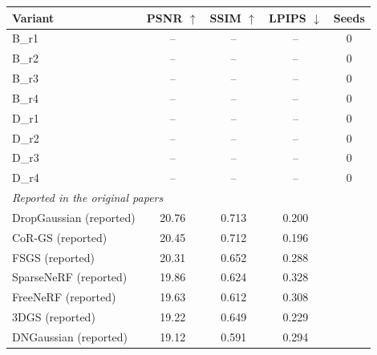 \begin{tabular}{lcccc}
\toprule
Variant & PSNR $\uparrow$ & SSIM $\uparrow$ & LPIPS $\downarrow$ & Seeds \\
\midrule
B_r1 & – & – & – & 0 \\
B_r2 & – & – & – & 0 \\
B_r3 & – & – & – & 0 \\
B_r4 & – & – & – & 0 \\
D_r1 & – & – & – & 0 \\
D_r2 & – & – & – & 0 \\
D_r3 & – & – & – & 0 \\
D_r4 & – & – & – & 0 \\
\midrule
\multicolumn{5}{l}{\textit{Reported in the original papers}} \\
DropGaussian (reported) & 20.76 & 0.713 & 0.200 &  \\
CoR-GS (reported) & 20.45 & 0.712 & 0.196 &  \\
FSGS (reported) & 20.31 & 0.652 & 0.288 &  \\
SparseNeRF (reported) & 19.86 & 0.624 & 0.328 &  \\
FreeNeRF (reported) & 19.63 & 0.612 & 0.308 &  \\
3DGS (reported) & 19.22 & 0.649 & 0.229 &  \\
DNGaussian (reported) & 19.12 & 0.591 & 0.294 &  \\
\bottomrule
\end{tabular}
